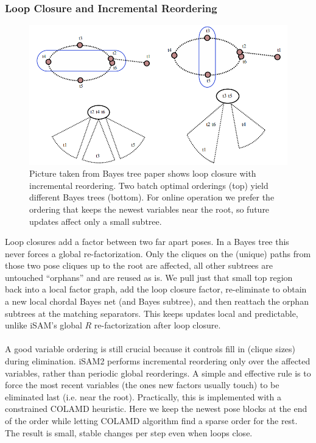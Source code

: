 \subsubsection{Loop Closure and Incremental Reordering}
\begin{figure}[H]
    \centering
    \includegraphics[width=0.98\linewidth]{Pictures/Optimizers/iSAM2/incremental_reordering.png}
    \caption{Picture taken from Bayes tree paper \cite{Bayes_tree_for_SLAM_paper} shows loop closure with incremental reordering. Two batch optimal orderings (top) yield different Bayes trees (bottom). For online operation we prefer the ordering that keeps the newest variables near the root, so future updates affect only a small subtree.}
    \label{fig:optimizer-iSAM2-incremental-reordering}
\end{figure}
\noindent
Loop closures add a factor between two far apart poses. In a Bayes tree this never forces a global re-factorization. Only the cliques on the (unique) paths from those two pose cliques up to the root are affected, all other subtrees are untouched ``orphans'' and are reused as is. We pull just that small top region back into a local factor graph, add the loop closure factor, re-eliminate to obtain a new local chordal Bayes net (and Bayes subtree), and then reattach the orphan subtrees at the matching separators. This keeps updates local and predictable, unlike iSAM's global $R$ re-factorization after loop closure. \cite{iSAM2_paper,Bayes_tree_for_SLAM_paper}
\\ \\
A good variable ordering is still crucial because it controls fill in (clique sizes) during elimination. iSAM2 performs incremental reordering only over the affected variables, rather than periodic global reorderings. A simple and effective rule is to force the most recent variables (the ones new factors usually touch) to be eliminated last (i.e. near the root). Practically, this is implemented with a constrained COLAMD heuristic. Here we keep the newest pose blocks at the end of the order while letting COLAMD algorithm find a sparse order for the rest. The result is small, stable changes per step even when loops close. \cite{Bayes_tree_for_SLAM_paper}
